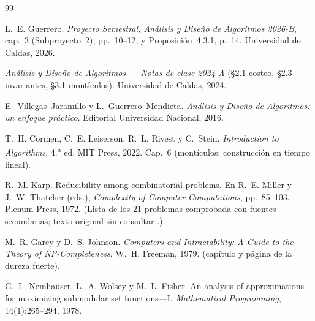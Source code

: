\begin{thebibliography}{99}

L.~E. Guerrero.
\newblock \emph{Proyecto Semestral, Análisis y Diseño de Algoritmos 2026-B}, cap.~3 (Subproyecto~2), pp.~10--12, y Proposición~4.3.1, p.~14.
\newblock Universidad de Caldas, 2026.

\emph{Análisis y Diseño de Algoritmos — Notas de clase 2024-A} (§2.1 costeo, §2.3 invariantes, §3.1 montículos).
\newblock Universidad de Caldas, 2024.

E.~Villegas~Jaramillo y L.~Guerrero~Mendieta.
\newblock \emph{Análisis y Diseño de Algoritmos: un enfoque práctico}.
\newblock Editorial Universidad Nacional, 2016.

T.~H. Cormen, C.~E. Leiserson, R.~L. Rivest y C.~Stein.
\newblock \emph{Introduction to Algorithms}, 4.\textsuperscript{a} ed.
\newblock MIT Press, 2022. Cap.~6 (montículos; construcción en tiempo lineal).

R.~M. Karp.
\newblock Reducibility among combinatorial problems.
\newblock En R.~E. Miller y J.~W. Thatcher (eds.), \emph{Complexity of Computer Computations}, pp.~85--103. Plenum Press, 1972.
\newblock (Lista de los 21 problemas comprobada con fuentes secundarias; texto original sin consultar \VER.)

M.~R. Garey y D.~S. Johnson.
\newblock \emph{Computers and Intractability: A Guide to the Theory of NP-Completeness}.
\newblock W.~H. Freeman, 1979. \VER{} (capítulo y página de la dureza fuerte).

G.~L. Nemhauser, L.~A. Wolsey y M.~L. Fisher.
\newblock An analysis of approximations for maximizing submodular set functions---I.
\newblock \emph{Mathematical Programming}, 14(1):265--294, 1978.


\end{thebibliography}
